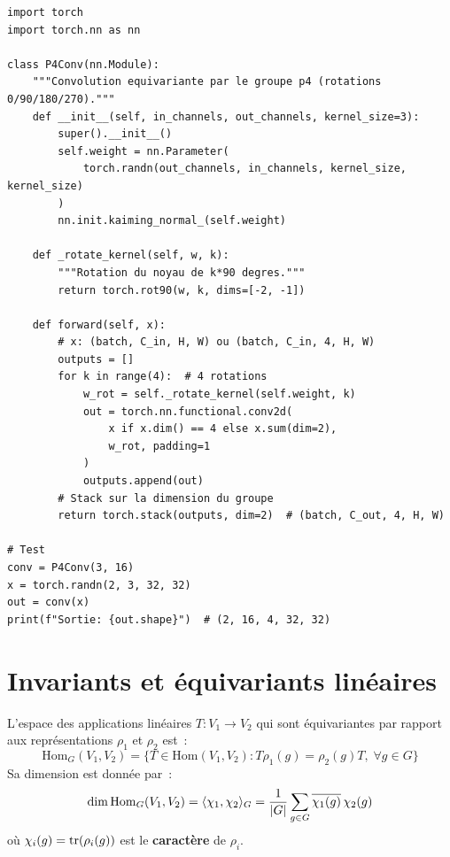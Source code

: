 \begin{codeblock}[title=\textbf{G-CNN pour le groupe $p4$ (rotations 90\textdegree)}]
\begin{verbatim}
import torch
import torch.nn as nn

class P4Conv(nn.Module):
    """Convolution equivariante par le groupe p4 (rotations 0/90/180/270)."""
    def __init__(self, in_channels, out_channels, kernel_size=3):
        super().__init__()
        self.weight = nn.Parameter(
            torch.randn(out_channels, in_channels, kernel_size, kernel_size)
        )
        nn.init.kaiming_normal_(self.weight)

    def _rotate_kernel(self, w, k):
        """Rotation du noyau de k*90 degres."""
        return torch.rot90(w, k, dims=[-2, -1])

    def forward(self, x):
        # x: (batch, C_in, H, W) ou (batch, C_in, 4, H, W)
        outputs = []
        for k in range(4):  # 4 rotations
            w_rot = self._rotate_kernel(self.weight, k)
            out = torch.nn.functional.conv2d(
                x if x.dim() == 4 else x.sum(dim=2),
                w_rot, padding=1
            )
            outputs.append(out)
        # Stack sur la dimension du groupe
        return torch.stack(outputs, dim=2)  # (batch, C_out, 4, H, W)

# Test
conv = P4Conv(3, 16)
x = torch.randn(2, 3, 32, 32)
out = conv(x)
print(f"Sortie: {out.shape}")  # (2, 16, 4, 32, 32)
\end{verbatim}
\end{codeblock}

\section{Invariants et \'equivariants lin\'eaires}

\begin{theoreme}
L'espace des applications lin\'eaires $T: V_1 \to V_2$ qui sont \'equivariantes
par rapport aux repr\'esentations $\rho_1$ et $\rho_2$ est~:
\[
    \mathrm{Hom}_G(V_1, V_2) = \{T \in \mathrm{Hom}(V_1, V_2) :
    T\rho_1(g) = \rho_2(g)T,\; \forall g \in G\}
\]
Sa dimension est donn\'ee par~:
\[
    \dim \mathrm{Hom}_G(V_1, V_2) = \langle \chi_1, \chi_2 \rangle_G
    = \frac{1}{\left| G \right|} \sum_{g \in G} \overline{\chi_1(g)}\, \chi_2(g)
\]
o\`u $\chi_i(g) = \mathrm{tr}(\rho_i(g))$ est le \textbf{caract\`ere} de $\rho_i$.
\end{theoreme}

